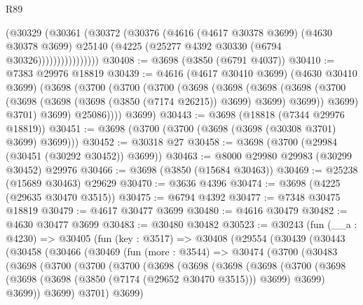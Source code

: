 \begin{lexlean}{R89}
\begin{coremodule}
                    (@30329
                      (@30361
                        (@30372
                          (@30376
                            (@4616
                              (@4617 @30378 @3699)
                              (@4630 @30378 @3699)
                              @25140
                              (@4225 (@25277 @4392 @30330 (@6794 @30326))))))))))))))))
@30408 := @3698 (@3850 (@6791 @4037))
@30410 := @7383 @29976 @18819
@30439 := @4616
    (@4617 @30410 @3699)
    (@4630 @30410 @3699)
    (@3698
      (@3700
        (@3700
          (@3700
            (@3698
              (@3698
                (@3698
                  (@3698
                    (@3700 (@3698 (@3698 (@3698 (@3850 (@7174 @26215)) @3699) @3699) @3699))
                    @3699)
                  @3701)
                @3699)
              @25086))))
      @3699)
@30443 := @3698 (@18818 (@7344 @29976 @18819))
@30451 := @3698 (@3700 (@3700 (@3698 (@3698 (@30308 @3701) @3699) @3699)))
@30452 := @30318 @27
@30458 := @3698 (@3700 (@29984 (@30451 (@30292 @30452)) @3699))
@30463 := @8000 @29980 @29983 (@30299 @30452) @29976
@30466 := @3698 (@3850 (@15684 @30463))
@30469 := @25238 (@15689 @30463) @29629
@30470 := @3636 @4396
@30474 := @3698 (@4225 (@29635 @30470 @3515))
@30475 := @6794 @4392
@30477 := @7348 @30475 @18819
@30479 := @4617 @30477 @3699
@30480 := @4616 @30479
@30482 := @4630 @30477 @3699
@30483 := @30480 @30482
@30523 := @30243
    (fun (__a : @4230) =>
    @30405
      (fun (key : @3517) =>
      @30408
        (@29554
          (@30439
            (@30443
              (@30458
                (@30466
                  (@30469
                    (fun (more : @3544) =>
                    @30474
                      (@3700
                        (@30483
                          (@3698
                            (@3700
                              (@3700
                                (@3700
                                  (@3698
                                    (@3698
                                      (@3698
                                        (@3698
                                          (@3700
                                            (@3698
                                              (@3698
                                                (@3698 (@3850 (@7174 (@29652 @30470 @3515))) @3699)
                                                @3699)
                                              @3699))
                                          @3699)
                                        @3701)
                                      @3699)

\end{coremodule}
\end{lexlean}
